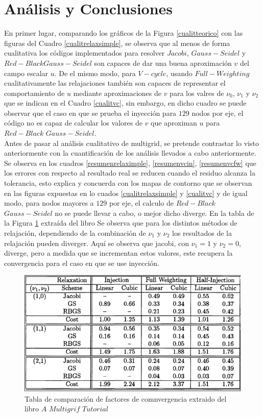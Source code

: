 \documentclass[letter,10pt]{article}
\begin{document}
\newpage

\section{Análisis y Conclusiones}

En primer lugar, comparando los gráficos de la Figura \ref{cualitteorico} con las figuras del Cuadro \ref{cualitrelaxsimple}, se observa que al menos de forma cualitativa los códigos implementados para resolver $Jacobi$, $Gauss-Seidel$ y $Red-Black Gauss-Seidel$ son capaces de dar una buena aproximación $v$ del campo escalar $u$. De el mismo modo, para $V-cycle$, usando $Full-Weighting$ cualitativamente las relajaciones también son capaces de representar el comportamiento de $u$ mediante aproximaciones de $v$ para los valres de $\nu_0$, $\nu_1$ y $\nu_2$ que se indican en el Cuadro \ref{cualitvc}, sin embargo, en dicho cuadro se puede observar que el caso en que se prueba el inyección para $129$ nodos por eje, el código no es capaz de calcular los valores de $v$ que aproximan $u$ para $Red-Black$ $Gauss-Seidel$.\\
\indent Antes de pasar al análisis cualitativo de multigrid, se pretende contrastar lo visto anteriormente con la cuantificación de los análisis llevados a cabo anteriormente. Se observa en los cuadros \ref{resumenrelaximple}, \ref{resumenvcin}, \ref{resumenvcfw} que los errores con respecto al resultado real se reducen cuando el residuo alcanza la tolerancia, esto explica y concuerda con los mapas de contorno que se observan en las figuras expuestas en lo cuados \ref{cualitrelaxsimple} y \ref{cualitvc} y de igual modo, para nodos mayores a $129$ por eje, el calculo de $Red-Black$ $Gauss-Seidel$ no se puede llevar a cabo, o mejor dicho diverge. En la tabla de la Figura \ref{tablaejemplolibro} extraída del libro \cite{converfact} Se observa que para los distintos métodos de relajación, dependiendo de la combinación de $\nu_1$ y $\nu_2$ los resultados de la relajación pueden diverger. Aquí se observa que jacobi, con $\nu_1=1$ y $\nu_2=0$, diverge, pero a medida que se incrementan estos valores, este recupera la convergencia para el caso en que se use inyección.\\

\begin{figure}[H]
\centering
\includegraphics[scale=0.6]{img/tablalibro}
\caption{Tabla de comparación de factores de comnvergencia extraido del libro $A$ $Multigrif$ $Tutorial$ \cite{converfact}}
\label{tablaejemplolibro}
\end{figure}
\end{document}
